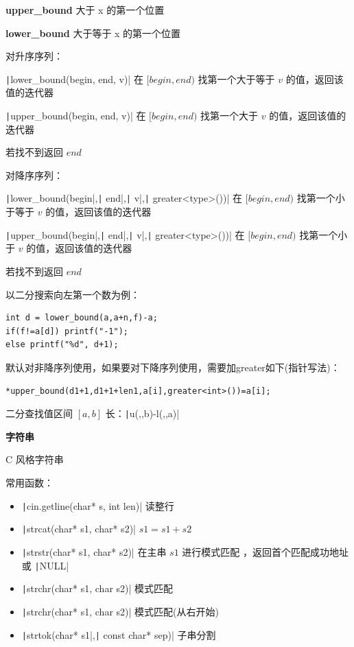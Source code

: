 \documentclass[twocolumn,10pt]{ctexart}
\makeatletter
\newcommand{\hfive}[1]{\par\addvspace{6pt}\@afterindentfalse
  {\noindent\bfseries\normalsize #1}\par\nobreak\vspace{2pt}}
\makeatother
\begin{document}
\textbf{upper\_bound} 大于 x 的第一个位置

\textbf{lower\_bound} 大于等于 x 的第一个位置

对升序序列：

\texttt|lower_bound(begin, end, v)|  在 $[begin,end)$ 找第一个大于等于 $v$ 的值，返回该值的迭代器

\texttt|upper_bound(begin, end, v)|  在 $[begin,end)$ 找第一个大于 $v$ 的值，返回该值的迭代器

若找不到返回 $end$

对降序序列：

\texttt|lower_bound(begin|,\allowbreak \texttt| end|,\allowbreak \texttt| v|,\allowbreak \texttt| greater<type>())|  在 $[begin,end)$ 找第一个小于等于 $v$ 的值，返回该值的迭代器

\texttt|upper_bound(begin|,\allowbreak \texttt| end|,\allowbreak \texttt| v|,\allowbreak \texttt| greater<type>())|  在 $[begin,end)$ 找第一个小于 $v$ 的值，返回该值的迭代器

若找不到返回 $end$

以二分搜索向左第一个数为例：

\begin{verbatim}
int d = lower_bound(a,a+n,f)-a;
if(f!=a[d]) printf("-1");
else printf("%d", d+1);
\end{verbatim}

默认对非降序列使用，如果要对下降序列使用，需要加greater如下(指针写法)：

\begin{verbatim}
*upper_bound(d1+1,d1+1+len1,a[i],greater<int>())=a[i];
\end{verbatim}

二分查找值区间 $[a,b]$ 长：\texttt|u(,,b)-l(,,a)|

\hfive{字符串}

C 风格字符串

常用函数：

\begin{itemize}
\item \texttt|cin.getline(char* s, int len)| 读整行
\item \texttt|strcat(char* s1, char* s2)| $s1=s1+s2$
\item \texttt|strstr(char* s1, char* s2)| 在主串 $s1$ 进行模式匹配 ，返回首个匹配成功地址或 \texttt|NULL|
\item \texttt|strchr(char* s1, char s2)| 模式匹配
\item \texttt|strchr(char* s1, char s2)| 模式匹配(从右开始)
\item \texttt|strtok(char* s1|,\allowbreak \texttt| const char* sep)| 子串分割
\end{itemize}
\end{document}
